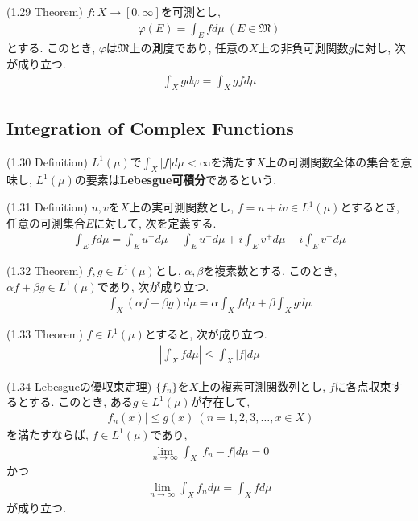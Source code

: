 \documentclass[a4paper]{jsarticle}
\begin{document}
\begin{thm}{(1.29 Theorem)}{}
    $f:X\to [0, \infty]$を可測とし, 
    \begin{align*}
        \varphi(E) = \int_E fd\mu \ (E\in \mathfrak{M})
    \end{align*}
    とする. このとき, $\varphi$は$\mathfrak{M}$上の測度であり, 任意の$X$上の非負可測関数$g$に対し, 次が成り立つ.
    \begin{align*}
        \int_X gd\varphi = \int_X gfd\mu
    \end{align*}
\end{thm}

\subsection{Integration of Complex Functions}
\begin{defi}{(1.30 Definition)}{}
    $L^1(\mu)$で$\int_X|f|d\mu < \infty$を満たす$X$上の可測関数全体の集合を意味し, $L^1(\mu)$の要素は{\bf Lebesgue可積分}であるという.
\end{defi}

\begin{defi}{(1.31 Definition)}{}
    $u,v$を$X$上の実可測関数とし, $f=u+iv\in L^1(\mu)$とするとき, 任意の可測集合$E$に対して, 次を定義する.
    \begin{align*}
        \int_E fd\mu = \int_E u^+d\mu - \int_E u^-d\mu  + i\int_E v^+d\mu - i\int_E v^-d\mu
    \end{align*}
\end{defi}

\begin{thm}{(1.32 Theorem)}{}
    $f, g\in L^1(\mu)$とし, $\alpha, \beta$を複素数とする. このとき, $\alpha f+ \beta g\in L^1(\mu)$であり, 次が成り立つ.
    \begin{align*}
        \int_X (\alpha f + \beta g)d\mu = \alpha \int_X fd\mu + \beta \int_X gd\mu
    \end{align*}
\end{thm}

\begin{thm}{(1.33 Theorem)}{}
    $f\in L^1(\mu)$とすると, 次が成り立つ.
    \begin{align*}
        \left| \int_X fd\mu \right| \leq \int_X |f|d\mu
    \end{align*}
\end{thm}

\begin{thm}{(1.34 Lebesgueの優収束定理)}{}
    $\{f_n\}$を$X$上の複素可測関数列とし, $f$に各点収束するとする. このとき, ある$g\in L^1(\mu)$が存在して, 
    \begin{align*}
        |f_n(x)|\leq g(x) \ (n=1, 2, 3, \dots, x\in X)
    \end{align*}
    を満たすならば, $f\in L^1(\mu)$であり,
    \begin{align*}
        \lim_{n\to \infty} \int_X |f_n-f|d\mu = 0
    \end{align*}
    かつ
    \begin{align*}
        \lim_{n\to \infty} \int_X f_nd\mu = \int_X fd\mu
    \end{align*}
    が成り立つ.
\end{thm}
\end{document}
